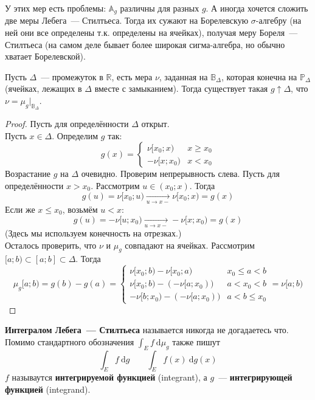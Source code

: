 \documentclass{article}
\begin{document}
    \begin{remark}
        У этих мер есть проблемы: $\mathbb A_g$ различны для разных $g$. А иногда хочется сложить две меры Лебега~--- Стилтьеса. Тогда их сужают на Борелевскую $\sigma$-алгебру (на ней они все определены т.к. определены на ячейках), получая меру Бореля~--- Стилтьеса (на самом деле бывает более широкая сигма-алгебра, но обычно хватает Борелевской).
    \end{remark}
    \begin{lemma}
        Пусть $\Delta$~--- промежуток в $\mathbb R$, есть мера $\nu$, заданная на $\mathbb B_\Delta$, которая конечна на $\mathbb P_\Delta$ (ячейках, лежащих в $\Delta$ вместе с замыканием). Тогда существует такая $g\uparrow\Delta$, что $\nu=\mu_g\big|_{\mathbb B_\Delta}$.
    \end{lemma}
    \begin{proof}
        Пусть для определённости $\Delta$ открыт.\\
        Пусть $x\in\Delta$. Определим $g$ так:
        $$
        g(x)=\begin{cases}
            \nu[x_0;x) & x\geqslant x_0\\
            -\nu[x;x_0) & x<x_0
        \end{cases}
        $$
        Возрастание $g$ на $\Delta$ очевидно. Проверим непрерывность слева. Пусть для определённости $x>x_0$. Рассмотрим $u\in(x_0;x)$. Тогда
        $$
        g(u)=\nu[x_0;u)\underset{u\to x-}\longrightarrow\nu[x_0;x)=g(x)
        $$
        Если же $x\leqslant x_0$, возьмём $u<x$:
        $$
        g(u)=-\nu[u;x_0)\underset{u\to x-}\longrightarrow-\nu[x;x_0)=g(x)
        $$
        (Здесь мы используем конечность на отрезках.)\\
        Осталось проверить, что $\nu$ и $\mu_g$ совпадают на ячейках. Рассмотрим $[a;b)\subset[a;b]\subset\Delta$. Тогда
        $$
        \mu_g[a;b)=g(b)-g(a)=\begin{cases}
            \nu[x_0;b)-\nu[x_0;a) & x_0\leqslant a<b\\
            \nu[x_0;b)-(-\nu[a;x_0)) & a<x_0<b\\
            -\nu[b;x_0)-(-\nu[a;x_0)) & a<b\leqslant x_0
        \end{cases}=\nu[a;b)
        $$
    \end{proof}
    \begin{definition}
        \textbf{Интегралом Лебега~--- Стилтьеса} называется никогда не догадаетесь что. Помимо стандартного обозначения $\int_Ef~\mathrm d\mu_g$ также пишут
        $$
        \int_Ef~\mathrm dg\qquad \int_Ef(x)~\mathrm dg(x)
        $$
        $f$ называутся \textbf{интегрируемой функцией} (integrant), а $g$~--- \textbf{интегрирующей функцией} (integrand).
    \end{definition}
\end{document}
